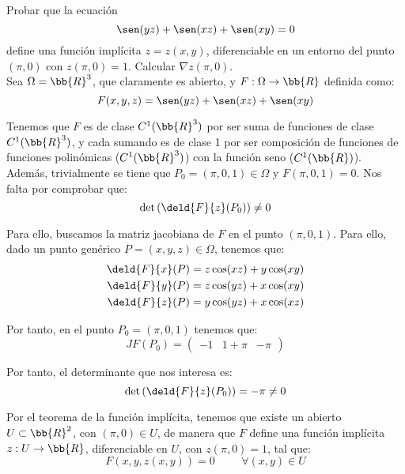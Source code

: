 \begin{ejercicio}
    Probar que la ecuación
    $$\sen(yz) + \sen(xz) + \sen(xy) = 0$$
    define una función implícita $z = z(x, y)$, diferenciable en un entorno del punto $(\pi, 0)$ con $z(\pi, 0) = 1$.
    Calcular $\nabla z(\pi, 0)$.\\

    Sea $\Omega = \bb{R}^3$, que claramente es abierto, y $F:\Omega \to \bb{R}$ definida como:
    \begin{equation*}
        F(x,y,z) = \sen(yz) + \sen(xz) + \sen(xy)
    \end{equation*}

    Tenemos que $F$ es de clase $C^1(\bb{R}^3)$ por ser suma de funciones de clase $C^1(\bb{R}^3)$, y cada sumando es de clase 1 por ser composición de funciones de funciones polinómicas ($C^1(\bb{R}^3)$) con la función seno ($C^1(\bb{R})$).
    Además, trivialmente se tiene que $P_0=(\pi,0,1)\in \Omega$ y $F(\pi,0,1)=0$. Nos falta por comprobar que:
    \begin{equation*}
        \det \left( \deld{F}{z}(P_0) \right) \neq 0
    \end{equation*}

    Para ello, buscamos la matriz jacobiana de $F$ en el punto $(\pi,0,1)$. Para ello, dado un punto genérico $P=(x,y,z)\in \Omega$, tenemos que:
    \begin{align*}
        \deld{F}{x}(P) &= z\cos(xz) + y\cos(xy) \\
        \deld{F}{y}(P) &= z\cos(yz) + x\cos(xy) \\
        \deld{F}{z}(P) &= y\cos(yz) + x\cos(xz)
    \end{align*}

    Por tanto, en el punto $P_0=(\pi,0,1)$ tenemos que:
    \begin{equation*}
        JF(P_0) = \left(
            \begin{array}{ccc}
                -1 & 1+\pi & -\pi
            \end{array}
        \right)
    \end{equation*}

    Por tanto, el determinante que nos interesa es:
    \begin{equation*}
        \det \left( \deld{F}{z}(P_0) \right) = -\pi \neq 0
    \end{equation*}

    Por el teorema de la función implícita, tenemos que existe un abierto $U\subset \bb{R}^2$, con $(\pi,0)\in U$,
    de manera que $F$ define una función implícita $z:U\to \bb{R}$, diferenciable en $U$, con $z(\pi,0)=1$, tal que:
    \begin{equation}
        F(x,y,z(x,y)) = 0 \hspace{1cm} \forall (x,y)\in U
    \end{equation}


\end{ejercicio}
